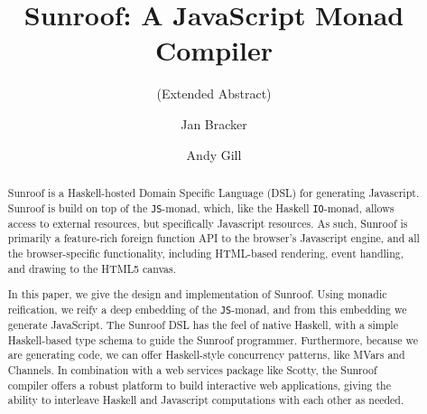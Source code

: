 \documentclass{llncs}
\newcommand{\Src}[1]{{\tt{#1}}}
\newcommand{\IO}{\Src{IO}}
\newcommand{\JS}{\Src{JS}}
\begin{document}
%
\title{Sunroof: A JavaScript Monad Compiler}
\subtitle{(Extended Abstract)}
%
%
\author{Jan Bracker  \and Andy Gill}
%
%
%


\maketitle              %

\begin{abstract}
Sunroof is a Haskell-hosted Domain Specific Language (DSL) for generating Javascript.
Sunroof is build on top of the \JS-monad, which, like the Haskell \IO-monad, allows 
access to external resources, but specifically Javascript
resources. As such, Sunroof is primarily a feature-rich foreign
function API to the browser's Javascript engine, and all the browser-specific
functionality, including HTML-based rendering, event handling, and 
drawing to the HTML5 canvas. 

In this paper, we give the design and implementation of Sunroof.
Using monadic reification, we reify a deep embedding of the \JS-monad,
and from this embedding we generate JavaScript.
The Sunroof DSL has the feel of native Haskell, with a simple
Haskell-based type schema to guide the Sunroof programmer.
Furthermore, because we are generating code,
we can offer Haskell-style concurrency patterns, like MVars and Channels.
In combination with a web services package like Scotty,
the Sunroof compiler offers a robust platform to build interactive web applications,
giving the ability to interleave Haskell and Javascript computations
with each other as needed.
\end{abstract}
\end{document}
